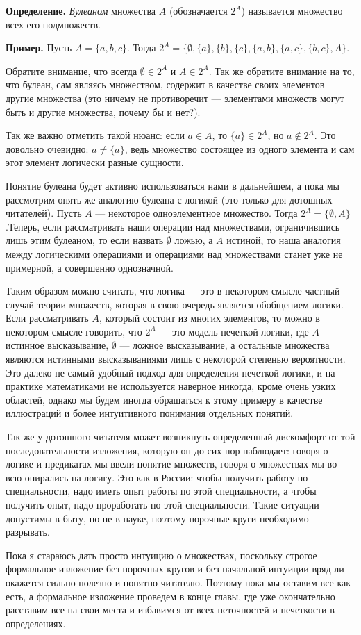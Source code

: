 {\bfseries Определение.} {\slshape Булеаном} множества $A$ (обозначается $2^A$) называется множество всех его подмножеств.

{\bfseries Пример.} Пусть $A = \{a, b, c\}$. Тогда $2^A = \{\emptyset, \{a\}, \{b\}, \{c\}, \{a, b\}, \{a, c\}, \{b, c\}, A\}$.

Обратите внимание, что всегда $\emptyset \in 2^A$ и $A\in 2^A$. Так же обратите внимание на то, что булеан, сам являясь множеством, содержит в качестве своих элементов другие множества (это ничему не противоречит — элементами множеств могут быть и другие множества, почему бы и нет?).

Так же важно отметить такой нюанс: если $a \in A$, то $\{a\} \in 2^A$, но $a \not \in 2^A$. Это довольно очевидно: $a\not = \{a\}$, ведь множество состоящее из одного элемента и сам этот элемент логически разные сущности.

Понятие булеана будет активно использоваться нами в дальнейшем, а пока мы рассмотрим опять же аналогию булеана с логикой (это только для дотошных читателей). Пусть $A$ — некоторое одноэлементное множество. Тогда $2^A = \{\emptyset, A\}$.Теперь, если рассматривать наши операции над множествами, ограничившись лишь этим булеаном, то если назвать $\emptyset$ ложью, а $A$ истиной, то наша аналогия между логическими операциями и операциями над множествами станет уже не примерной, а совершенно однозначной.

Таким образом можно считать, что логика — это в некотором смысле частный случай теории множеств, которая в свою очередь является обобщением логики. Если рассматривать $A$, который состоит из многих элементов, то можно в некотором смысле говорить, что $2^A$ — это модель нечеткой логики, где $A$ — истинное высказывание, $\emptyset$ — ложное высказывание, а остальные множества являются истинными высказываниями лишь с некоторой степенью вероятности. Это далеко не самый удобный подход для определения нечеткой логики, и на практике математиками не используется наверное никогда, кроме очень узких областей, однако мы будем иногда обращаться к этому примеру в качестве иллюстраций и более интуитивного понимания отдельных понятий.

Так же у дотошного читателя может возникнуть определенный дискомфорт от той последовательности изложения, которую он до сих пор наблюдает: говоря о логике и предикатах мы ввели понятие множеств, говоря о множествах мы во всю опирались на логигу. Это как в России: чтобы получить работу по специальности, надо иметь опыт работы по этой специальности, а чтобы получить опыт, надо проработать по этой специальности. Такие ситуации допустимы в быту, но не в науке, поэтому порочные круги необходимо разрывать.

Пока я стараюсь дать просто интуицию о множествах, поскольку строгое формальное изложение без порочных кругов и без начальной интуиции вряд ли окажется сильно полезно и понятно читателю. Поэтому пока мы оставим все как есть, а формальное изложение проведем в конце главы, где уже окончательно расставим все на свои места и избавимся от всех неточностей и нечеткости в определениях.
